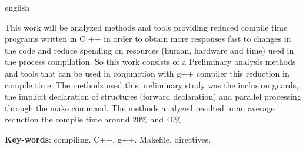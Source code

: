 \begin{resumo}[Abstract]
 \begin{otherlanguage*}{english}


  This work will be analyzed methods and tools 
  providing reduced compile time
  programs written in C ++ in order to obtain more responses
  fast to changes in the code and reduce spending on resources
  (human, hardware and time) used in the process
  compilation. So this work consists of a
  Preliminary analysis methods and tools that can
  be used in conjunction with g++ compiler
  this reduction in compile time. The methods used
  this preliminary study was the inclusion guards,
  the implicit declaration of structures (forward declaration)
  and parallel processing through the make command.
  The methods analyzed resulted in an average reduction
  the compile time around 20\% and 40\%
   \vspace{\onelineskip}
 
   \noindent 
   \textbf{Key-words}: compiling. C++. g++. Makefile. directives. 
 \end{otherlanguage*}
\end{resumo}

